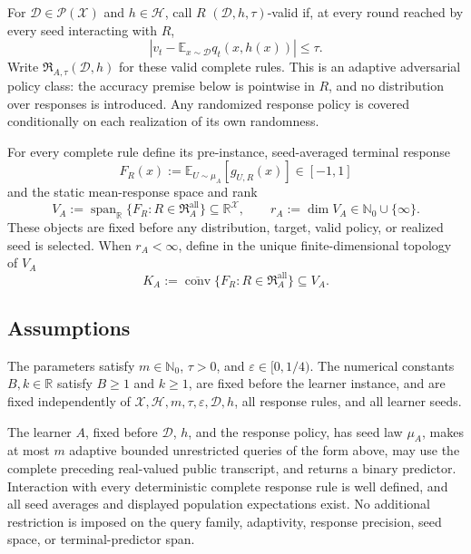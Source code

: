 For \(\mathcal D\in\mathcal P(\mathcal X)\) and \(h\in\mathcal H\), call
\(R\) \((\mathcal D,h,\tau)\)-valid if, at every round reached by every
seed interacting with \(R\),
\[
\left|v_t-\mathbb E_{x\sim\mathcal D}q_t(x,h(x))\right|\le\tau.
\]
Write \(\mathfrak R_{A,\tau}(\mathcal D,h)\) for these valid complete rules.
This is an adaptive adversarial policy class: the accuracy premise below is
pointwise in \(R\), and no distribution over responses is introduced.
Any randomized response policy is covered conditionally on each realization
of its own randomness.

For every complete rule define its pre-instance, seed-averaged terminal
response
\[
F_R(x):=\mathbb E_{U\sim\mu_A}[g_{U,R}(x)]\in[-1,1]
\]
and the static mean-response space and rank
\[
V_A:=\operatorname{span}_{\mathbb R}
\{F_R:R\in\mathfrak R_A^{\mathrm{all}}\}
\subseteq\mathbb R^{\mathcal X},
\qquad
r_A:=\dim V_A\in\mathbb N_0\cup\{\infty\}.
\]
These objects are fixed before any distribution, target, valid policy, or
realized seed is selected.  When \(r_A<\infty\), define in the unique
finite-dimensional topology of \(V_A\)
\[
K_A:=\overline{\operatorname{conv}}
\{F_R:R\in\mathfrak R_A^{\mathrm{all}}\}\subseteq V_A.
\]

\subsection{Assumptions}

\begin{assumption}
\label{assump:parameter-regime}
The parameters satisfy \(m\in\mathbb N_0\), \(\tau>0\), and
\(\varepsilon\in[0,1/4)\).  The numerical constants \(B,k\in\mathbb R\)
satisfy \(B\ge1\) and \(k\ge1\), are fixed before the learner instance, and
are fixed independently of
\(\mathcal X,\mathcal H,m,\tau,\varepsilon,\mathcal D,h\), all response
rules, and all learner seeds.
\end{assumption}

\begin{assumption}
\label{assump:adaptive-sq-interface}
The learner \(A\), fixed before \(\mathcal D\), \(h\), and the response
policy, has seed law \(\mu_A\), makes at most \(m\) adaptive bounded
unrestricted queries of the form above, may use the complete preceding
real-valued public transcript, and returns a binary predictor.  Interaction
with every deterministic complete response rule is well defined, and all seed
averages and displayed population expectations exist.  No additional
restriction is imposed on the query family, adaptivity, response precision,
seed space, or terminal-predictor span.
\end{assumption}

